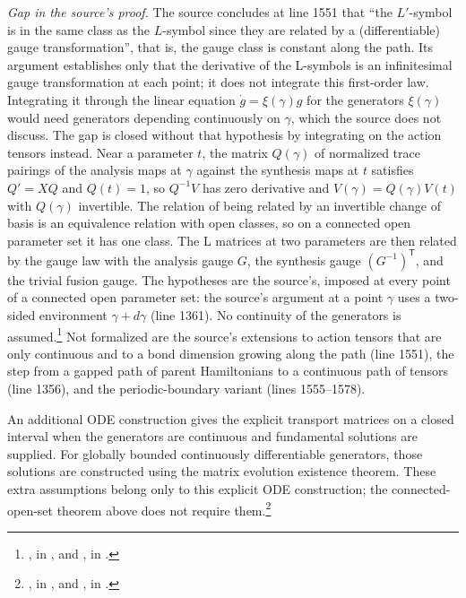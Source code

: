 \documentclass{article}
\begin{document}
\emph{Gap in the source's proof.} The source concludes at line 1551 that
``the $L'$-symbol is in the same class as the $L$-symbol since they are
related by a (differentiable) gauge transformation'', that is, the gauge
class is constant along the path. Its argument establishes only that the
derivative of the L-symbols is an infinitesimal gauge transformation at each
point; it does not integrate this first-order law. Integrating it through
the linear equation $\dot g=\xi(\gamma)g$ for the generators $\xi(\gamma)$
would need generators depending continuously on $\gamma$, which the source
does not discuss. The gap is closed without that hypothesis by integrating
on the action tensors instead. Near a parameter $t$, the matrix $Q(\gamma)$
of normalized trace pairings of the analysis maps at $\gamma$ against the
synthesis maps at $t$ satisfies $Q'=XQ$ and $Q(t)=1$, so $Q^{-1}V$ has zero
derivative and $V(\gamma)=Q(\gamma)V(t)$ with $Q(\gamma)$ invertible. The
relation of being related by an invertible change of basis is an
equivalence relation with open classes, so on a connected open parameter
set it has one class. The L matrices at two parameters are then related by
the gauge law with the analysis gauge $G$, the synthesis gauge
$(G^{-1})^{\mathsf T}$, and the trivial fusion gauge. The hypotheses are the
source's, imposed at every point of a connected open parameter set: the
source's argument at a point $\gamma$ uses a two-sided environment
$\gamma+d\gamma$ (line 1361). No continuity of the generators is
assumed.\footnote{
    , in
    , and
    , in
    .}
Not formalized are the source's extensions to action tensors that are only
continuous and to a bond dimension growing along the path (line 1551), the
step from a gapped path of parent Hamiltonians to a continuous path of
tensors (line 1356), and the periodic-boundary variant (lines 1555--1578).

An additional ODE construction gives the explicit transport matrices on a
closed interval when the generators are continuous and fundamental
solutions are supplied. For globally bounded continuously differentiable
generators, those solutions are constructed using the matrix evolution
existence theorem. These extra assumptions belong only to this explicit
ODE construction; the connected-open-set theorem above does not require
them.\footnote{
    , in
    , and
    , in
    .}
\end{document}
